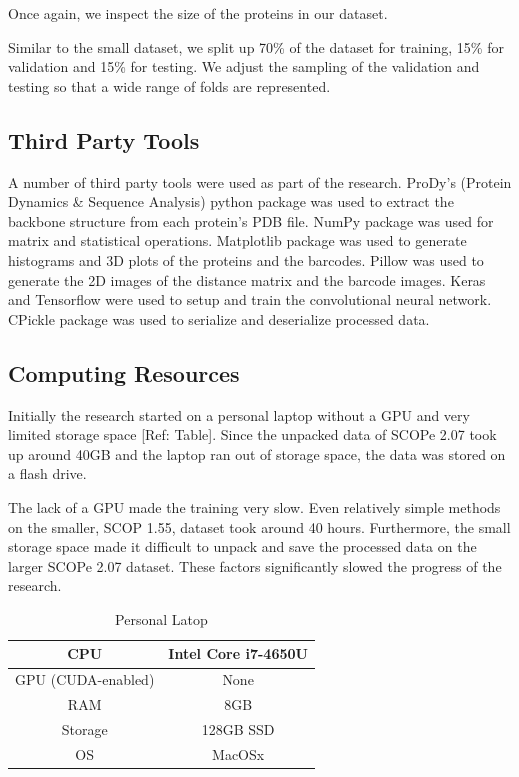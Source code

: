 \documentclass[12pt, a4paper, twocolumn, fullpage]{article}
\theoremstyle{plain}
\theoremstyle{definition}
\theoremstyle{remark}
\begin{document}
Once again, we inspect the size of the proteins in our dataset.

Similar to the small dataset, we split up 70\% of the dataset for training, 15\% for validation and 15\% for testing. We adjust the sampling of the validation and testing so that a wide range of folds are represented.
    
\subsection{Third Party Tools}

A number of third party tools were used as part of the research. ProDy's (Protein Dynamics \& Sequence Analysis) python package was used to extract the backbone structure from each protein's PDB file. NumPy package was used for matrix  and statistical operations. Matplotlib package was used to generate histograms and 3D plots of the proteins and the barcodes. Pillow was used to generate the 2D images of the distance matrix and the barcode images. Keras and Tensorflow were used to setup and train the convolutional neural network. CPickle package was used to serialize and deserialize processed data.
    
\subsection{Computing Resources}

Initially the research started on a personal laptop without a GPU and very limited storage space [Ref: Table]. Since the unpacked data of SCOPe 2.07 took up around 40GB and the laptop ran out of storage space, the data was stored on a flash drive. 

The lack of a GPU made the training very slow. Even relatively simple methods on the smaller, SCOP 1.55, dataset took around 40 hours. Furthermore, the small storage space made it difficult to unpack and save the processed data on the larger SCOPe 2.07 dataset. These factors significantly slowed the progress of the research.


\begin{table}[t]
    \centering
    \begin{tabular}{c | c}
        CPU & Intel Core i7-4650U \\ \hline
        GPU (CUDA-enabled) & None     \\ \hline
        RAM & 8GB    \\ \hline
        Storage & 128GB SSD \\ \hline
        OS & MacOSx  
    \end{tabular}
    \caption{Personal Latop}
    \label{tbl:Computer 1}
\end{table}
\end{document}
